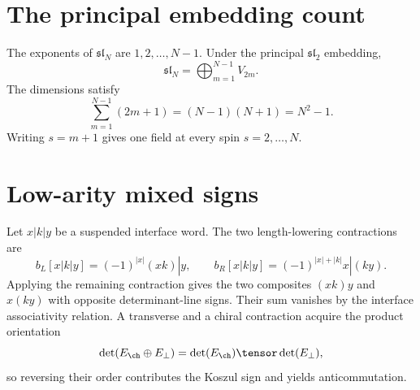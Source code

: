 \chapter{The principal embedding count}
The exponents of $\mathfrak{sl}_N$ are $1,2,\ldots,N-1$.  Under the principal $\mathfrak{sl}_2$ embedding,
\[
 \mathfrak{sl}_N=\bigoplus_{m=1}^{N-1}V_{2m}.
\]
The dimensions satisfy
\[
 \sum_{m=1}^{N-1}(2m+1)
 =(N-1)(N+1)=N^2-1.
\]
Writing $s=m+1$ gives one field at every spin $s=2,\ldots,N$.

\chapter{Low-arity mixed signs}
Let $x|k|y$ be a suspended interface word.  The two length-lowering contractions are
\[
 b_L[x|k|y]=(-1)^{|x|}(xk)|y,
 \qquad
 b_R[x|k|y]=(-1)^{|x|+|k|}x|(ky).
\]
Applying the remaining contraction gives the two composites $(xk)y$ and $x(ky)$ with opposite determinant-line signs.  Their sum vanishes by the interface associativity relation.  A transverse and a chiral contraction acquire the product orientation
\[
 \det(E_{\ch}\oplus E_\perp)
 =\det(E_{\ch})\tensor\det(E_\perp),
\]
so reversing their order contributes the Koszul sign and yields anticommutation.

